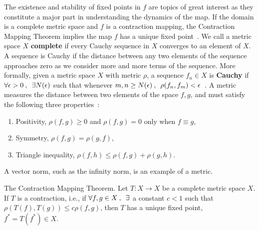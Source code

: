 The existence and stability of fixed points in $f$ are topics of great
interest as they constitute a major part in understanding the
dynamics of the map. If the domain is a complete metric space and $f$ is a contraction
mapping, the Contraction Mapping Theorem implies the map $f$ has a unique
fixed point~\cite{meiss}. We call a metric space $X$ \textbf{complete} if every
Cauchy sequence in $X$ converges to an element of $X$. A sequence is
Cauchy if the distance between any two elements of the sequence
approaches zero as we consider more and more terms of the
sequence. More formally, given a metric space $X$ with metric $\rho$, a sequence $f_n \in X$ is \textbf{Cauchy} if
$\forall \epsilon>0 \>,\enskip \exists N(\epsilon)$ such that whenever $m,n \geq
N(\epsilon)\>,\enskip \rho(f_n,f_m)<\epsilon$~\cite{meiss}. A metric measures
the distance between two elements of the space $f,g$, and must satisfy the following three
properties~\cite{meiss}:
\begin{enumerate}
\item Positivity, $\rho(f,g) \geq 0$ and $\rho(f,g)=0$ only when $f
  \equiv g$,
\item Symmetry, $\rho(f,g) = \rho(g,f)$,
\item Triangle inequality, $\rho(f,h) \leq \rho(f,g) + \rho(g,h)$.
\end{enumerate}
A vector norm, such as the infinity norm, is an example of a metric. 
\begin{singlespace}
\begin{theorem}\label{thm:contraction}
The Contraction Mapping Theorem. Let $T:X\to X$ be a complete metric space $X$. If $T$ is a
contraction, i.e., if $\forall f,g \in X\>,\enskip \exists$ a constant $c<1$
such that $\rho(T(f),T(g)) \leq c\rho(f,g)$, then $T$ has a unique
fixed point, $f^* = T(f^*) \in X$.
\end{theorem}
\end{singlespace}

